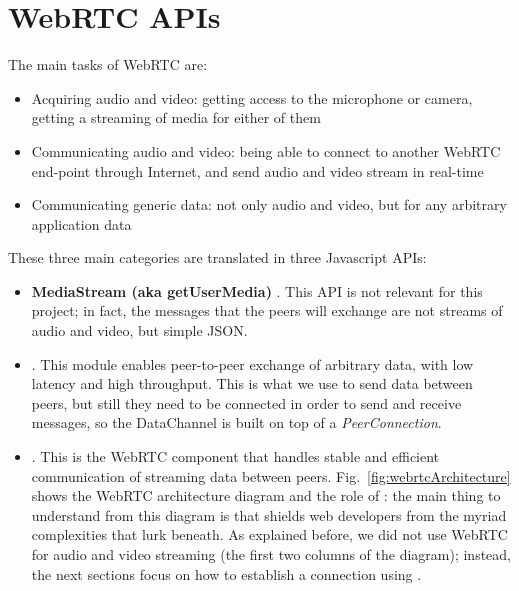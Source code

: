 \section{WebRTC APIs}
\label{sec:webrtc_api}
The main tasks of WebRTC are:
\begin{itemize}
	\item Acquiring audio and video: getting access to the microphone or camera, getting a streaming of media for either of them
	\item Communicating audio and video: being able to connect to another WebRTC end-point through Internet, and send audio and video stream in real-time
	\item Communicating generic data: not only audio and video, but for any arbitrary application data
\end{itemize}
These three main categories are translated in three Javascript APIs:
\begin{itemize}
	\item\textbf{MediaStream (aka getUserMedia) }.
This API is not relevant for this project; in fact, the messages that the peers will exchange are not streams of audio and video, but simple JSON.
	\item\textbf{\RTCPeerConnection}.
This module enables peer-to-peer exchange of arbitrary data, with low latency and high throughput. This is what we use to send data between peers, but still they need to be connected in order to send and receive messages, so the DataChannel is built on top of a \textit{PeerConnection}.
	\item\textbf{\RTCDataChannel}.
This is the WebRTC component that handles stable and efficient communication of streaming data between peers. Fig.~\ref{fig:webrtcArchitecture} shows the WebRTC architecture diagram and the role of \RTCPeerConnection: the main thing to understand from this diagram is that \RTCPeerConnection shields web developers from the myriad complexities that lurk beneath. As explained before, we did not use WebRTC for audio and video streaming (the first two columns of the diagram); instead, the next sections focus on how to establish a connection using \RTCPeerConnection.
\end{itemize}

